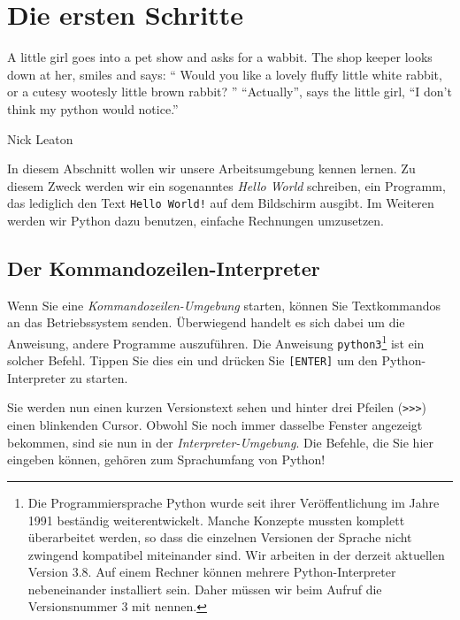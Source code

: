 \chapter{Die ersten Schritte}
\epigraph{
	A little girl goes into a pet show and asks for a wabbit. The shop keeper looks down at her, smiles
	and says:\newline
	\enquote{
		Would you like a lovely fluffy little white rabbit, or a cutesy wootesly little brown rabbit?
	}\newline
	\enquote{Actually}, says the little girl, \enquote{I don't think my python would notice.}
}{Nick Leaton}

In diesem Abschnitt wollen wir unsere Arbeitsumgebung kennen lernen. Zu diesem Zweck werden wir ein sogenanntes \emph{Hello World} schreiben, \ie ein Programm, das lediglich den Text \texttt{Hello World!} auf dem Bildschirm ausgibt. Im Weiteren werden wir Python dazu benutzen, einfache Rechnungen umzusetzen.



\section{Der Kommandozeilen-Interpreter} \label{sec:Interpreter}
Wenn Sie eine \emph{Kommandozeilen-Umgebung} starten, können Sie Textkommandos an das Betriebssystem senden. Überwiegend handelt es sich dabei um die Anweisung, andere Programme auszuführen. Die Anweisung \texttt{python3}\footnote{Die Programmiersprache Python wurde seit ihrer Veröffentlichung im Jahre 1991 beständig weiterentwickelt. Manche Konzepte mussten komplett überarbeitet werden, so dass die einzelnen Versionen der Sprache nicht zwingend kompatibel miteinander sind. Wir arbeiten in der derzeit aktuellen Version 3.8. Auf einem Rechner können mehrere Python-Interpreter nebeneinander installiert sein. Daher müssen wir beim Aufruf die Versionsnummer 3 mit nennen.} ist ein solcher Befehl. Tippen Sie dies ein und drücken Sie \texttt{[ENTER]} um den Python-Interpreter zu starten.

Sie werden nun einen kurzen Versionstext sehen und hinter drei Pfeilen (\texttt{>{}>{}>}) einen blinkenden Cursor. Obwohl Sie noch immer dasselbe Fenster angezeigt bekommen, sind sie nun in der \emph{Interpreter-Umgebung}. Die Befehle, die Sie hier eingeben können, gehören zum Sprachumfang von Python!


